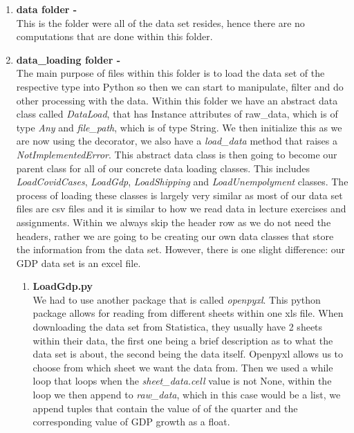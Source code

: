\documentclass[fontsize=11pt]{article}
\begin{document}
\begin{enumerate}
    
    \item \textbf{data folder -}\\
    This is the folder were all of the data set resides, hence there are no computations that are done within this folder.
    
    \item \textbf{data\_loading folder -}\\
    The main purpose of files within this folder is to load the data set of the respective type into Python so then we can start to manipulate, filter and do other processing with the data. Within this folder we have an abstract data class called \textit{DataLoad}, that has Instance attributes of raw\_data, which is of type \textit{Any} and \textit{file\_path}, which is of type String. We then initialize this as we are now using the \textit{\@dataclass} decorator, we also have a \textit{load\_data} method that raises a \textit{NotImplementedError}. This abstract data class is then going to become our parent class for all of our concrete data loading classes. This includes \textit{LoadCovidCases}, \textit{LoadGdp}, \textit{LoadShipping} and \textit{LoadUnempolyment} classes. The process of loading these classes is largely very similar as most of our data set files are csv files and it is similar to how we read data in lecture exercises and assignments. Within we always skip the header row as we do not need the headers, rather we are going to be creating our own data classes that store the information from the data set. However, there is one slight difference: our GDP data set is an excel file.
    
\begin{enumerate}
    \item \textbf{LoadGdp.py}\\
    We had to use another package that is called \textit{openpyxl}. This python package allows for reading from different sheets within one xls file. When downloading the data set from Statistica, they usually have 2 sheets within their data, the first one being a brief description as to what the data set is about, the second being the data itself. Openpyxl allows us to choose from which sheet we want the data from. Then we used a while loop that loops when the \textit{sheet\_data.cell} value is not None, within the loop we then append to \textit{raw\_data}, which in this case would be a list, we append tuples that contain the value of of the quarter and the corresponding value of GDP growth as a float.
\end{enumerate}


\end{enumerate}
\end{document}
